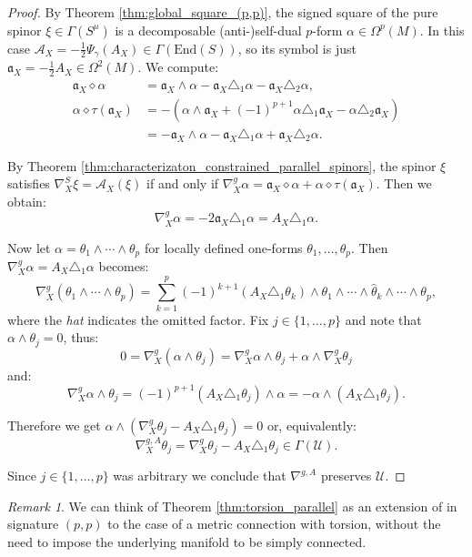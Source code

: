\documentclass[10pt,reqno]{amsart}
\theoremstyle{definition}
\theoremstyle{remark}
\newtheorem{remark}[theorem]{Remark}
\newcommand{\End}{\mathrm{End}}
\begin{document}
\begin{proof}
    By Theorem \ref{thm:global_square_(p,p)}, the signed square of the pure spinor $\xi\in\Gamma(S^\mu)$ is a decomposable (anti-)self-dual $p$-form $\alpha\in\Omega^p(M)$. In this case $\mathcal{A}_X=-\frac{1}{2}\Psi_\gamma(A_X)\in\Gamma(\End(S))$, so its symbol is just $\mathfrak{a}_X=-\frac{1}{2}A_X\in\Omega^2(M)$. We compute: \begin{align*}
        \mathfrak{a}_X\diamond\alpha&=\mathfrak{a}_X\wedge\alpha-\mathfrak{a}_X\triangle_1\alpha-\mathfrak{a}_X\triangle_2\alpha,\\
        \alpha\diamond\tau(\mathfrak{a}_X)&=-(\alpha\wedge\mathfrak{a}_X+(-1)^{p+1}\alpha\triangle_1\mathfrak{a}_X-\alpha\triangle_2\mathfrak{a}_X)\\
        &=-\mathfrak{a}_X\wedge\alpha-\mathfrak{a}_X\triangle_1\alpha+\mathfrak{a}_X\triangle_2\alpha.
    \end{align*}
    
    By Theorem \ref{thm:characterizaton_constrained_parallel_spinors}, the spinor $\xi$ satisfies $\nabla^S_X\xi=\mathcal{A}_X(\xi)$ if and only if $\nabla^g_X\alpha=\mathfrak{a}_X\diamond\alpha+\alpha\diamond\tau(\mathfrak{a}_X)$. Then we obtain: $$\nabla^g_X\alpha=-2\mathfrak{a}_X\triangle_1\alpha=A_X\triangle_1\alpha.$$
    
    Now let $\alpha=\theta_1\wedge\cdots\wedge\theta_p$ for locally defined one-forms $\theta_1,\ldots,\theta_p$. Then $\nabla^g_X\alpha=A_X\triangle_1\alpha$ becomes: $$\nabla^g_X(\theta_1\wedge\cdots\wedge\theta_p)=\sum_{k=1}^p(-1)^{k+1}(A_X\triangle_1\theta_k)\wedge\theta_1\wedge\cdots\wedge\widehat{\theta}_k\wedge\cdots\wedge\theta_p,$$ where the \emph{hat} indicates the omitted factor. Fix $j\in\{1,\ldots,p\}$ and note that $\alpha\wedge\theta_j=0$, thus: $$0=\nabla^g_X(\alpha\wedge\theta_j)=\nabla^g_X\alpha\wedge\theta_j+\alpha\wedge\nabla^g_X\theta_j$$ and: $$\nabla^g_X\alpha\wedge\theta_j=(-1)^{p+1}(A_X\triangle_1\theta_j)\wedge\alpha=-\alpha\wedge(A_X\triangle_1\theta_j).$$

    Therefore we get $\alpha\wedge(\nabla^g_X\theta_j-A_X\triangle_1\theta_j)=0$ or, equivalently: $$\nabla^{g,A}_X\theta_j=\nabla^g_X\theta_j-A_X\triangle_1\theta_j\in\Gamma(\mathcal{U}).$$

    Since $j\in\{1,\ldots,p\}$ was arbitrary we conclude that $\nabla^{g,A}$ preserves $\mathcal{U}$.
\end{proof}

\begin{remark}
    We can think of Theorem \ref{thm:torsion_parallel} as an extension of \cite[Prop.\ 5.3]{Kath_2000} in signature $(p,p)$ to the case of a metric connection with torsion, without the need to impose the underlying manifold to be simply connected.
\end{remark}
\end{document}
